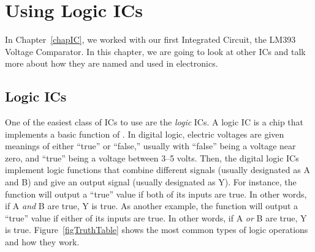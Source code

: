 \chapter{Using Logic ICs}
\label{chapLogicICs}

In Chapter~\ref{chapIC}, we worked with our first Integrated Circuit, the LM393 Voltage Comparator.  
In this chapter, we are going to look at other ICs and talk more about how they are named and used in electronics.

\section{Logic ICs}

One of the easiest class of ICs to use are the \emph{logic} ICs.  
A logic IC is a chip that implements a basic function of .
In digital logic, electric voltages are given meanings of either ``true'' or ``false,'' usually with ``false'' being a voltage near zero, and ``true'' being a voltage between 3--5 volts.
Then, the digital logic ICs implement logic functions that combine different signals (usually designated as A and B) and give an output signal (usually designated as Y).
For instance, the  function will output a ``true'' value if both of its inputs are true.  
In other words, if A \emph{and} B are true, Y is true.
As another example, the  function will output a ``true'' value if either of its inputs are true.
In other words, if A \emph{or} B are true, Y is true.
Figure~\ref{figTruthTable} shows the most common types of logic operations and how they work.

